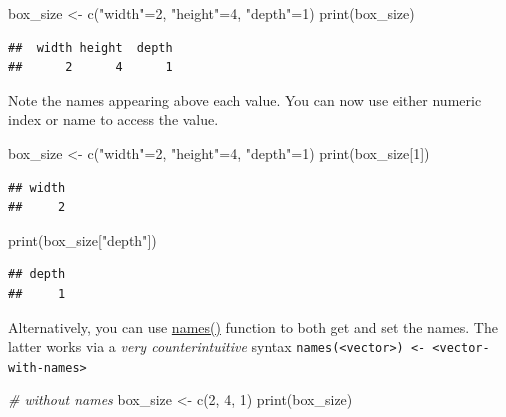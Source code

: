\documentclass[
]{book}
\newenvironment{Shaded}{\begin{snugshade}}{\end{snugshade}}
\newcommand{\CommentTok}[1]{\textcolor[rgb]{0.56,0.35,0.01}{\textit{#1}}}
\newcommand{\DecValTok}[1]{\textcolor[rgb]{0.00,0.00,0.81}{#1}}
\newcommand{\FunctionTok}[1]{\textcolor[rgb]{0.00,0.00,0.00}{#1}}
\newcommand{\NormalTok}[1]{#1}
\newcommand{\OtherTok}[1]{\textcolor[rgb]{0.56,0.35,0.01}{#1}}
\newcommand{\StringTok}[1]{\textcolor[rgb]{0.31,0.60,0.02}{#1}}
\begin{document}
\begin{Shaded}
\begin{Highlighting}[]
\NormalTok{box\_size }\OtherTok{\textless{}{-}} \FunctionTok{c}\NormalTok{(}\StringTok{"width"}\OtherTok{=}\DecValTok{2}\NormalTok{, }\StringTok{"height"}\OtherTok{=}\DecValTok{4}\NormalTok{, }\StringTok{"depth"}\OtherTok{=}\DecValTok{1}\NormalTok{) }
\FunctionTok{print}\NormalTok{(box\_size)}
\end{Highlighting}
\end{Shaded}

\begin{verbatim}
##  width height  depth 
##      2      4      1
\end{verbatim}

Note the names appearing above each value. You can now use either numeric index or name to access the value.

\begin{Shaded}
\begin{Highlighting}[]
\NormalTok{box\_size }\OtherTok{\textless{}{-}} \FunctionTok{c}\NormalTok{(}\StringTok{"width"}\OtherTok{=}\DecValTok{2}\NormalTok{, }\StringTok{"height"}\OtherTok{=}\DecValTok{4}\NormalTok{, }\StringTok{"depth"}\OtherTok{=}\DecValTok{1}\NormalTok{) }
\FunctionTok{print}\NormalTok{(box\_size[}\DecValTok{1}\NormalTok{])}
\end{Highlighting}
\end{Shaded}

\begin{verbatim}
## width 
##     2
\end{verbatim}

\begin{Shaded}
\begin{Highlighting}[]
\FunctionTok{print}\NormalTok{(box\_size[}\StringTok{"depth"}\NormalTok{])}
\end{Highlighting}
\end{Shaded}

\begin{verbatim}
## depth 
##     1
\end{verbatim}

Alternatively, you can use \href{https://www.rdocumentation.org/packages/base/versions/3.6.2/topics/names}{names()} function to both get and set the names. The latter works via a \emph{very counterintuitive} syntax \texttt{names(\textless{}vector\textgreater{})\ \textless{}-\ \textless{}vector-with-names\textgreater{}}

\begin{Shaded}
\begin{Highlighting}[]
\CommentTok{\# without names}
\NormalTok{box\_size }\OtherTok{\textless{}{-}} \FunctionTok{c}\NormalTok{(}\DecValTok{2}\NormalTok{, }\DecValTok{4}\NormalTok{, }\DecValTok{1}\NormalTok{) }
\FunctionTok{print}\NormalTok{(box\_size)}
\end{Highlighting}
\end{Shaded}
\end{document}
